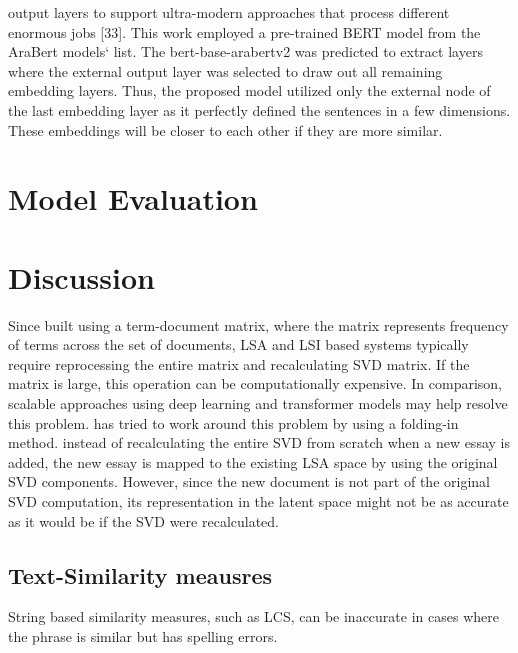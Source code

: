 \documentclass{article}
\begin{document}
output layers to support ultra-modern approaches that process 
different enormous jobs [33].
This work employed a pre-trained BERT model from the 
AraBert models‘ list. The bert-base-arabertv2 was predicted to 
extract layers where the external output layer was selected to 
draw out all remaining embedding layers. Thus, the proposed 
model utilized only the external node of the last embedding 
layer as it perfectly defined the sentences in a few dimensions. 
These embeddings will be closer to each other if they are more 
similar.



\section{Model Evaluation}


\section{Discussion}
Since built using a term-document matrix, where the matrix represents frequency of terms across the set of documents, LSA and LSI based systems typically require reprocessing the entire matrix and recalculating SVD matrix. If the matrix is large, this operation can be computationally expensive. In comparison, scalable approaches using deep learning and transformer models may help resolve this problem. \cite{17_abbas2015svm} has tried to work around this problem by using a folding-in method. instead of recalculating the entire SVD from scratch when a new essay is added, the new essay is mapped to the existing LSA space by using the original SVD components. However, since the new document is not part of the original SVD computation, its representation in the latent space might not be as accurate as it would be if the SVD were recalculated.

\subsection{Text-Similarity meausres}
String based similarity measures, such as LCS, can be inaccurate in cases where the phrase is similar but has spelling errors. 
% 
\printbibliography
% 
\end{document}
